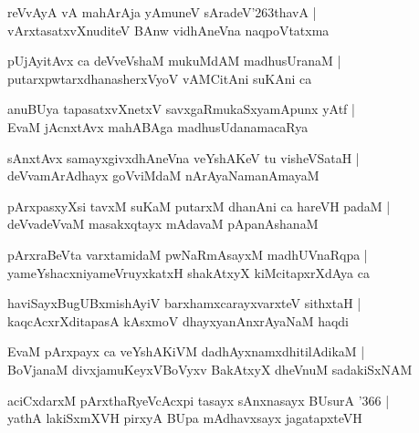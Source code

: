 \documentclass[twoside,12pt,openright]{book}
\def\S{\char'263}
\newcounter{shloka}[chapter]
\begin{document}
\begin{shloka}%
reVvAyA vA mahArAja yAmuneV sAradeV\S thavA |\\
vArxtasatxvXnuditeV BAnw vidhAneVna naqpoVtatxma 
\end{shloka}

\begin{shloka}%
pUjAyitAvx ca deVveVshaM mukuMdAM madhusUranaM |\\
putarxpwtarxdhanasherxVyoV vAMCitAni suKAni ca 
\end{shloka}

\begin{shloka}%
anuBUya tapasatxvXnetxV savxgaRmukaSxyamApunx yAtf |\\
EvaM jAcnxtAvx mahABAga madhusUdanamacaRya 
\end{shloka}

\begin{shloka}%
sAnxtAvx samayxgivxdhAneVna veYshAKeV tu visheVSataH |\\
deVvamArAdhayx goVviMdaM nArAyaNamanAmayaM 
\end{shloka}

\begin{shloka}%
pArxpasxyXsi tavxM suKaM putarxM dhanAni ca hareVH padaM |\\
deVvadeVvaM masakxqtayx mAdavaM pApanAshanaM 
\end{shloka}

\begin{shloka}%
pArxraBeVta varxtamidaM pwNaRmAsayxM madhUVnaRqpa |\\
yameYshacxniyameVruyxkatxH shakAtxyX kiMcitapxrXdAya ca 
\end{shloka}

\begin{shloka}%
haviSayxBugUBxmishAyiV barxhamxcarayxvarxteV sithxtaH |\\
kaqcAcxrXditapasA kAsxmoV dhayxyanAnxrAyaNaM haqdi
\end{shloka}

\begin{shloka}%
EvaM pArxpayx ca veYshAKiVM dadhAyxnamxdhitilAdikaM |\\
BoVjanaM divxjamuKeyxVBoVyxv BakAtxyX dheVnuM sadakiSxNAM 
\end{shloka}

\begin{shloka}%
aciCxdarxM pArxthaRyeVcAcxpi tasayx sAnxnasayx BUsurA \char'366 |\\
yathA lakiSxmXVH pirxyA BUpa mAdhavxsayx jagatapxteVH
\end{shloka}
\end{document}
